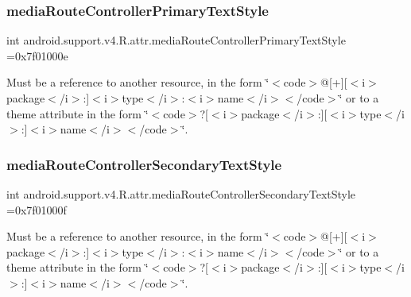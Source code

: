 \subsubsection{\texorpdfstring{media\+Route\+Controller\+Primary\+Text\+Style}{mediaRouteControllerPrimaryTextStyle}}
{\footnotesize\ttfamily int android.\+support.\+v4.\+R.\+attr.\+media\+Route\+Controller\+Primary\+Text\+Style =0x7f01000e\hspace{0.3cm}{\ttfamily [static]}}

Must be a reference to another resource, in the form \char`\"{}$<$code$>$@\mbox{[}+\mbox{]}\mbox{[}$<$i$>$package$<$/i$>$\+:\mbox{]}$<$i$>$type$<$/i$>$\+:$<$i$>$name$<$/i$>$$<$/code$>$\char`\"{} or to a theme attribute in the form \char`\"{}$<$code$>$?\mbox{[}$<$i$>$package$<$/i$>$\+:\mbox{]}\mbox{[}$<$i$>$type$<$/i$>$\+:\mbox{]}$<$i$>$name$<$/i$>$$<$/code$>$\char`\"{}. \mbox{\label{classandroid_1_1support_1_1v4_1_1R_1_1attr_a2325c29e9eb062cd0edb2d63932bc3dd}} 
\subsubsection{\texorpdfstring{media\+Route\+Controller\+Secondary\+Text\+Style}{mediaRouteControllerSecondaryTextStyle}}
{\footnotesize\ttfamily int android.\+support.\+v4.\+R.\+attr.\+media\+Route\+Controller\+Secondary\+Text\+Style =0x7f01000f\hspace{0.3cm}{\ttfamily [static]}}

Must be a reference to another resource, in the form \char`\"{}$<$code$>$@\mbox{[}+\mbox{]}\mbox{[}$<$i$>$package$<$/i$>$\+:\mbox{]}$<$i$>$type$<$/i$>$\+:$<$i$>$name$<$/i$>$$<$/code$>$\char`\"{} or to a theme attribute in the form \char`\"{}$<$code$>$?\mbox{[}$<$i$>$package$<$/i$>$\+:\mbox{]}\mbox{[}$<$i$>$type$<$/i$>$\+:\mbox{]}$<$i$>$name$<$/i$>$$<$/code$>$\char`\"{}. \mbox{\label{classandroid_1_1support_1_1v4_1_1R_1_1attr_a4462c08ee703366213195af68be0f007}} 
